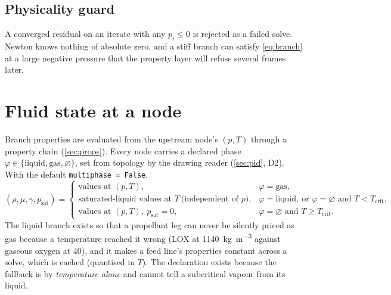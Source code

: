 \documentclass[11pt,a4paper]{article}
\newcommand{\code}[1]{\texttt{#1}}
\begin{document}
\subsection{Physicality guard}
A converged residual on an iterate with any $p_i\le0$ is rejected as a failed
solve. Newton knows nothing of absolute zero, and a stiff branch can satisfy
\cref{eq:branch} at a large negative pressure that the property layer will
refuse several frames later.

\section{Fluid state at a node}\label{sec:phase}

Branch properties are evaluated from the upstream node's $(p,T)$ through a
property chain (\cref{sec:props}). Every node carries a declared phase
$\varphi\in\{\text{liquid},\text{gas},\varnothing\}$, set from topology by the
drawing reader (\cref{sec:pid}, D2). With the default \code{multiphase = False},
\begin{equation}
  (\rho,\mu,\gamma,p_{\mathrm{sat}}) = \begin{cases}
    \text{values at }(p,T), & \varphi=\text{gas},\\[2pt]
    \text{saturated-liquid values at } T\ \text{(independent of $p$)}, & \varphi=\text{liquid},\ \text{or } \varphi=\varnothing \text{ and } T<T_{\mathrm{crit}},\\[2pt]
    \text{values at }(p,T),\ p_{\mathrm{sat}}=0, & \varphi=\varnothing \text{ and } T\ge T_{\mathrm{crit}}.
  \end{cases}
  \label{eq:phaserule}
\end{equation}
The liquid branch exists so that a propellant leg can never be silently priced
as gas because a temperature reached it wrong (LOX at
\SI{1140}{\kilogram\per\cubic\metre} against gaseous oxygen at \num{40}), and
it makes a feed line's properties constant across a solve, which is cached
(quantised in $T$). The declaration exists because the fallback is by
\emph{temperature alone} and cannot tell a subcritical vapour from its liquid.
\end{document}

